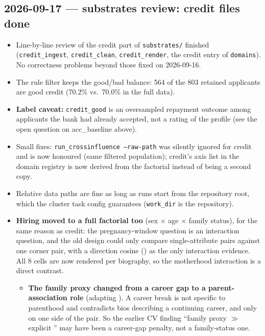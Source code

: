 \documentclass{article}
\begin{document}
\subsection*{2026-09-17 --- substrates review: credit files done}
\begin{itemize}
  \item Line-by-line review of the credit part of \texttt{substrates/} finished (\texttt{credit\_ingest},
        \texttt{credit\_clean}, \texttt{credit\_render}, the credit entry of \texttt{domains}). No
        correctness problems beyond those fixed on 2026-09-16.
  \item The rule filter keeps the good/bad balance: 564 of the 803 retained applicants are good credit
        (70.2\% vs.\ 70.0\% in the full data).
  \item \textbf{Label caveat:} \texttt{credit\_good} is an oversampled repayment outcome among applicants
        the bank had already accepted, not a rating of the profile (see the open question on
        acc\_baseline above).
  \item Small fixes: \texttt{run\_crossinfluence --raw-path} was silently ignored for credit and is now
        honoured (same filtered population); credit's axis list in the domain registry is now derived from
        the factorial instead of being a second copy.
  \item Relative data paths are fine as long as runs start from the repository root, which the cluster
        task config guarantees (\texttt{work\_dir} is the repository).
  \item \textbf{Hiring moved to a full factorial too} (sex $\times$ age $\times$ family status), for the
        same reason as credit: the pregnancy-window question is an interaction question, and the old
        design could only compare single-attribute pairs against one corner pair, with a direction
        cosine (\additivityCosCV{}) as the only interaction evidence. All 8 cells are now rendered per
        biography, so the motherhood interaction is a direct contrast.
        \begin{itemize}
          \item \textbf{The family proxy changed from a career gap to a parent-association role}
                (adapting \citet{correll2007motherhood}). A career break is not specific to parenthood
                and contradicts bios describing a continuing career, and only on one side of the pair.
                So the earlier CV finding ``family proxy \batteryFamilyProxyCV{} $\gg$ explicit
                \batteryFamilyExplicitCV{}'' may have been a career-gap penalty, not a family-status one.

\end{itemize}
\end{itemize}
\end{document}
